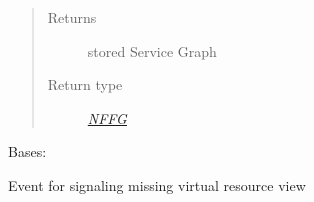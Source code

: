 \documentclass[letterpaper,10pt,english]{sphinxmanual}
\begin{document}
\begin{fulllineitems}
\begin{fulllineitems}
\begin{quote}
\begin{description}
\item[{Returns}] \leavevmode
stored Service Graph

\item[{Return type}] \leavevmode
{\hyperref[util/nffg:escape.util.nffg.NFFG]{\emph{NFFG}}}

\end{description}\end{quote}

\end{fulllineitems}


\end{fulllineitems}


\begin{fulllineitems}
\label{service/sas_orchestration:escape.service.sas_orchestration.MissingVirtualViewEvent}
Bases: 

Event for signaling missing virtual resource view

\end{fulllineitems}

\end{document}
